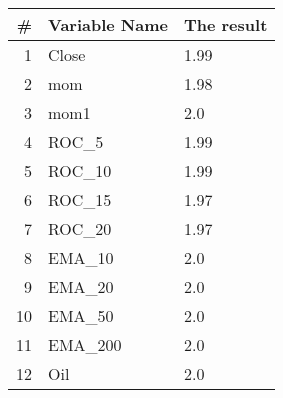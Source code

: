\begin{tabular}{rll}
\toprule
\# &  Variable Name &   The result \\
\midrule
1 & Close   &   1.99\\
2 & mom     &   1.98\\
3 & mom1    &   2.0\\
4 & ROC\_5   &   1.99\\
5 & ROC\_10  &   1.99\\
6 & ROC\_15  &   1.97\\
7 & ROC\_20  &   1.97\\
8 & EMA\_10  &   2.0\\
9 & EMA\_20  &   2.0\\
10 & EMA\_50  &   2.0\\
11 & EMA\_200 &        2.0\\
12 & Oil     &    2.0\\
\bottomrule
\end{tabular}



